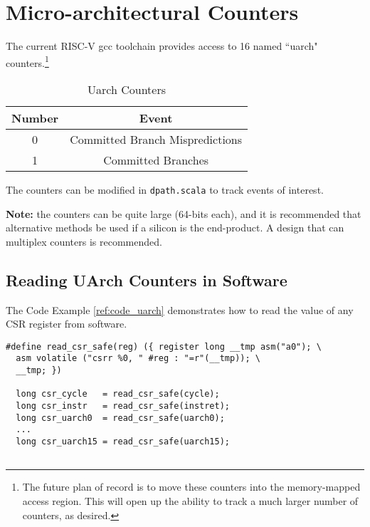\chapter{Micro-architectural Counters}

The current RISC-V gcc toolchain provides access to 16 named ``uarch" counters.\footnote{The future plan of record is to move these counters into the memory-mapped access region. This will open up the ability to track a much larger number of counters, as desired.}

\begin{table}[htdp]
\caption{Uarch Counters}
\begin{center}
\begin{tabular}{|c|c|}
\hline
Number & Event \\
\hline
\hline
0 & Committed Branch Mispredictions \\
\hline
1 & Committed Branches \\
\hline
\end{tabular}
\end{center}
\label{table:uarchcounters}
\end{table}%

The counters can be modified in {\tt dpath.scala} to track events of interest.

{\bf Note:} the counters can be quite large (64-bits each), and it is recommended that alternative methods be used if a silicon is the end-product. A design that can multiplex counters is recommended. 

\section{Reading UArch Counters in Software}

The Code Example \ref{ref:code_uarch} demonstrates how to read the value of any CSR register from software.
  
  
\begin{center}
\begin{minipage}{0.66\textwidth}
\begin{lstlisting}[caption=Reading a CSR register]
#define read_csr_safe(reg) ({ register long __tmp asm("a0"); \   
  asm volatile ("csrr %0, " #reg : "=r"(__tmp)); \               
  __tmp; })             
  
  long csr_cycle   = read_csr_safe(cycle);
  long csr_instr   = read_csr_safe(instret);
  long csr_uarch0  = read_csr_safe(uarch0);
  ...
  long csr_uarch15 = read_csr_safe(uarch15);
  
\end{lstlisting}\label{ref:code_uarch}
\end{minipage}
\end{center}


